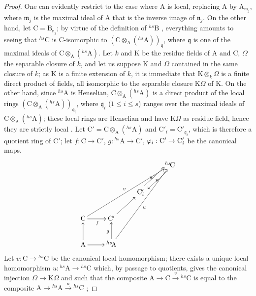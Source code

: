 \begin{proof}
One can evidently restrict to the case where A is local, replacing A by $\mathrm{A}_{\mathfrak{m}_j}$, where $\mathfrak{m}_j$ is the maximal ideal of A that is the inverse image of $\mathfrak{n}_j$.
On the other hand, let $\mathrm{C}=\mathrm{B}_{\mathfrak{n}_j}$;
by virtue of the definition of ${}^{hs}\!\mathrm{B}$ , everything amounts to seeing that ${}^{hs}\!\mathrm{C}$ is C-isomorphic to $(\mathrm{C}\otimes_{\mathrm{A}}({}^{hs}\!\mathrm{A}))_{\mathfrak{q}}$, where $\mathfrak{q}$ is one of the maximal ideals of $\mathrm{C}\otimes_{\mathrm{A}}({}^{hs}\!\mathrm{A})$.
Let $k$ and K be the residue fields of A and C, $\Omega$ the separable closure of $k$, and let us suppose K and $\Omega$ contained in the same closure of $k$;
as K is a finite extension of $k$, it is immediate that $\mathrm{K}\otimes_k\Omega$ is a finite direct product of fields, all isomorphic to the separable closure $\mathrm{K}\Omega$ of K.
On the other hand, since ${}^{hs}\!\mathrm{A}$ is Henselian, $\mathrm{C}\otimes_{\mathrm{A}}({}^{hs}\!\mathrm{A})$ is a direct product of the local rings $(\mathrm{C}\otimes_{\mathrm{A}}({}^{hs}\!\mathrm{A}))_{\mathfrak{q}_i}$, where $\mathfrak{q}_i$ ($1\leq i\leq s$) ranges over the maximal ideals of $\mathrm{C}\otimes_{\mathrm{A}}({}^{hs}\!\mathrm{A})$; these local rings are Henselian  and have $\mathrm{K}\Omega$ as residue field, hence they are strictly local .
Let $\mathrm{C}'=\mathrm{C}\otimes_{\mathrm{A}}({}^{hs}\!\mathrm{A})$ and $\mathrm{C}'_i=\mathrm{C}'_{\mathfrak{q}_i}$, which is therefore a quotient ring of $\mathrm{C}'$;
let $f:\mathrm{C}\to\mathrm{C}'$, $g:{}^{hs}\!\mathrm{A}\to\mathrm{C}'$, $\varphi_i:\mathrm{C}'\to\mathrm{C}'_i$ be the canonical maps.
\[
  \xymatrix{
    &&& {}^{hs}\!\mathrm{C} \ar@<0.8ex>[dl]_{w'} \\
    && \mathrm{C}'_i \ar@<0.8ex>[ur]_{w} \\
    \mathrm{C} \ar[uurrr]^{v} \ar[r]_{f} & \mathrm{C}' \ar[ur] \\
    \mathrm{A} \ar[u] \ar[r] & {}^{hs}\!\mathrm{A} \ar[u]^{g} \ar[uuurr]_{u}
  }
\]
Let $v:\mathrm{C}\to{}^{hs}\!\mathrm{C}$ be the canonical local homomorphism;
there exists a unique local homomorphism $u:{}^{hs}\!\mathrm{A}\to{}^{hs}\!\mathrm{C}$ which, by passage to quotients, gives the canonical injection $\Omega\to\mathrm{K}\Omega$ and such that the composite $\mathrm{A}\to\mathrm{C}\xrightarrow{v}{}^{hs}\!\mathrm{C}$ is equal to the composite $\mathrm{A}\to{}^{hs}\!\mathrm{A}\xrightarrow{u}{}^{hs}\!\mathrm{C}$ ;

\end{proof}
